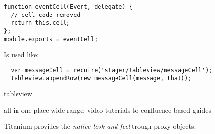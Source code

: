 \begin{verbatim}
function eventCell(Event, delegate) {
  // cell code removed
  return this.cell;
};
module.exports = eventCell;
\end{verbatim}

Is used like:
\begin{verbatim}
  var messageCell = require('stager/tableview/messageCell');
  tableview.appendRow(new messageCell(message, that));
\end{verbatim}




tableview.

all in one place
wide range: video tutorials to confluence based guides


Titanium provides the \emph{native look-and-feel} trough proxy objects. 
